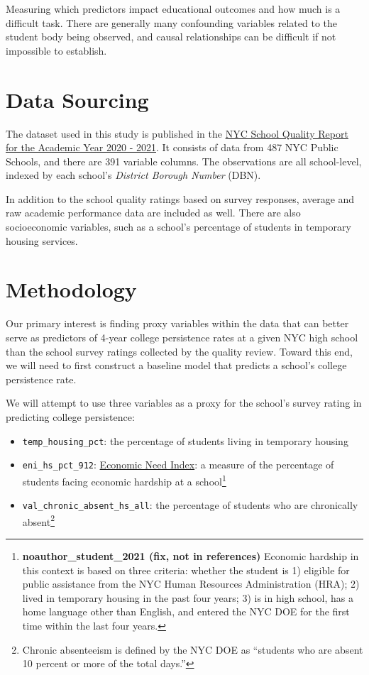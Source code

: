\documentclass[
  man,floatsintext]{apa6}
\providecommand{\tightlist}{%
  \setlength{\itemsep}{0pt}\setlength{\parskip}{0pt}}
\begin{document}
Measuring which predictors impact educational outcomes and how much is a difficult task. There are generally many confounding variables related to the student body being observed, and causal relationships can be difficult if not impossible to establish.

\hypertarget{data-sourcing}{%
\section{Data Sourcing}\label{data-sourcing}}

The dataset used in this study is published in the \href{https://data.cityofnewyork.us/Education/2020-2021-School-Quality-Reports-High-School/26je-vkp6}{NYC School Quality Report for the Academic Year 2020 - 2021}. It consists of data from 487 NYC Public Schools, and there are 391 variable columns. The observations are all school-level, indexed by each school's \emph{District Borough Number} (DBN).

In addition to the school quality ratings based on survey responses, average and raw academic performance data are included as well. There are also socioeconomic variables, such as a school's percentage of students in temporary housing services.

\hypertarget{methodology}{%
\section{Methodology}\label{methodology}}

Our primary interest is finding proxy variables within the data that can better serve as predictors of 4-year college persistence rates at a given NYC high school than the school survey ratings collected by the quality review. Toward this end, we will need to first construct a baseline model that predicts a school's college persistence rate.

We will attempt to use three variables as a proxy for the school's survey rating in predicting college persistence:

\begin{itemize}
\tightlist
\item
  \texttt{temp\_housing\_pct}: the percentage of students living in temporary housing
\item
  \texttt{eni\_hs\_pct\_912}: \href{https://data.cccnewyork.org/data/bar/1371/student-economic-need-index\#1371/a/1/1622/127}{Economic Need Index}: a measure of the percentage of students facing economic hardship at a school\footnote{\textbf{noauthor\_student\_2021 (fix, not in references)} Economic hardship in this context is based on three criteria: whether the student is 1) eligible for public assistance from the NYC Human Resources Administration (HRA); 2) lived in temporary housing in the past four years; 3) is in high school, has a home language other than English, and entered the NYC DOE for the first time within the last four years.}
\item
  \texttt{val\_chronic\_absent\_hs\_all}: the percentage of students who are chronically absent\footnote{Chronic absenteeism is defined by the NYC DOE as ``students who are absent 10 percent or more of the total days.''}
\end{itemize}
\end{document}
